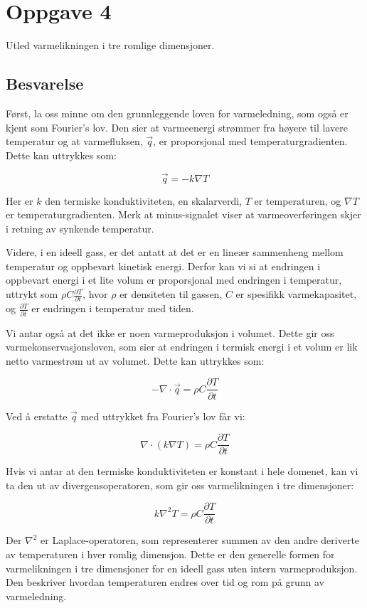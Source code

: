 \section{Oppgave 4}
Utled varmelikningen i tre romlige dimensjoner.

\subsection*{Besvarelse}
Først, la oss minne om den grunnleggende loven for varmeledning, som også er kjent som Fourier's lov. Den sier at varmeenergi strømmer fra høyere til lavere temperatur og at varmefluksen, $\vec{q}$, er proporsjonal med temperaturgradienten. Dette kan uttrykkes som:

\begin{equation*}
\vec{q} = -k \nabla T
\end{equation*}

Her er $k$ den termiske konduktiviteten, en skalarverdi, $T$ er temperaturen, og $\nabla T$ er temperaturgradienten. Merk at minus-signalet viser at varmeoverføringen skjer i retning av synkende temperatur.

Videre, i en ideell gass, er det antatt at det er en lineær sammenheng mellom temperatur og oppbevart kinetisk energi. Derfor kan vi si at endringen i oppbevart energi i et lite volum er proporsjonal med endringen i temperatur, uttrykt som $\rho C \frac{\partial T}{\partial t}$, hvor $\rho$ er densiteten til gassen, $C$ er spesifikk varmekapasitet, og $\frac{\partial T}{\partial t}$ er endringen i temperatur med tiden.

Vi antar også at det ikke er noen varmeproduksjon i volumet. Dette gir oss varmekonservasjonsloven, som sier at endringen i termisk energi i et volum er lik netto varmestrøm ut av volumet. Dette kan uttrykkes som:

\begin{equation*}
-\nabla \cdot \vec{q} = \rho C \frac{\partial T}{\partial t}
\end{equation*}

Ved å erstatte $\vec{q}$ med uttrykket fra Fourier's lov får vi:

\begin{equation*}
\nabla \cdot (k \nabla T) = \rho C \frac{\partial T}{\partial t}
\end{equation*}

Hvis vi antar at den termiske konduktiviteten er konstant i hele domenet, kan vi ta den ut av divergensoperatoren, som gir oss varmelikningen i tre dimensjoner:

\begin{equation*}
k \nabla^2 T = \rho C \frac{\partial T}{\partial t}
\end{equation*}

Der $\nabla^2$ er Laplace-operatoren, som representerer summen av den andre deriverte av temperaturen i hver romlig dimensjon. Dette er den generelle formen for varmelikningen i tre dimensjoner for en ideell gass uten intern varmeproduksjon. Den beskriver hvordan temperaturen endres over tid og rom på grunn av varmeledning.